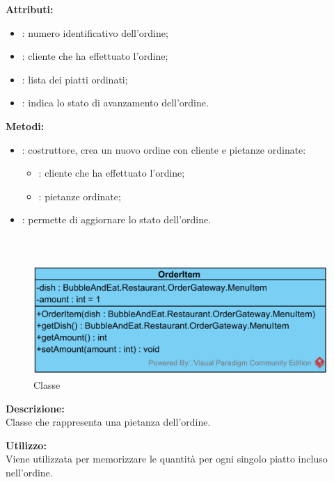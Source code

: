 \textbf{Attributi:}
\begin{itemize}
	\item {}: numero identificativo dell'ordine;
	\item {}: cliente che ha effettuato l'ordine;
	\item {}: lista dei piatti ordinati;
	\item {}: indica lo stato di avanzamento dell'ordine.
\end{itemize}

\textbf{Metodi:}
\begin{itemize}
	\item {}: costruttore, crea un nuovo ordine con cliente e pietanze ordinate:
	\begin{itemize}
		\item {}: cliente che ha effettuato l'ordine;
		\item {}: pietanze ordinate;
	\end{itemize}
	\item {}: permette di aggiornare lo stato dell'ordine.
\end{itemize}

\subparagraph[::OrderItem]{\class}\mbox{}\\ \label{\class}
\begin{figure}[H]
	\centering
	\includegraphics[width=12cm]{./diagrammi/demo/server/order/orderitem.png}
	\caption{Classe \class}
\end{figure}
\textbf{Descrizione:}\\
Classe che rappresenta una pietanza dell'ordine.

\textbf{Utilizzo:}\\
Viene utilizzata per memorizzare le quantità per ogni singolo piatto incluso nell'ordine.

%

